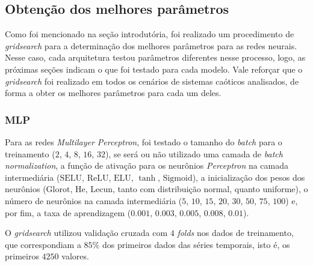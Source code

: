 \documentclass[10pt, technote]{article}
\newcommand{\sigmoid}{\text{Sigmoid}}
\newcommand{\selu}{\text{SELU}}
\newcommand{\relu}{\text{ReLU}}
\newcommand{\elu}{\text{ELU}}
\newcommand{\lecun}{\text{Lecun}}
\newcommand{\he}{\text{He}}
\newcommand{\glorot}{\text{Glorot}}
\begin{document}
\subsection{Obtenção dos melhores parâmetros}


Como foi mencionado na seção introdutória, foi realizado um procedimento de \textit{gridsearch} para a determinação dos melhores parâmetros para as redes neurais. Nesse caso, cada arquitetura testou parâmetros diferentes nesse processo, logo, as próximas seções indicam o que foi testado para cada modelo. Vale reforçar que o \textit{gridsearch} foi realizado em todos os cenários de sistemas caóticos analisados, de forma a obter os melhores parâmetros para cada um deles.

\subsubsection{MLP}

Para as redes \textit{Multilayer Perceptron}, foi testado o tamanho do \textit{batch} para o treinamento ($2$, $4$, $8$, $16$, $32$), se será ou não utilizado uma camada de \textit{batch normalization}, a função de ativação para os neurônios \textit{Perceptron} na camada intermediária ($\selu$, $\relu$, $\elu$, $\tanh$, $\sigmoid$), a inicialização dos pesos dos neurônios ($\glorot$, $\he$, $\lecun$, tanto com distribuição normal, quanto uniforme), o número de neurônios na camada intermediária ($5$, $10$, $15$, $20$, $30$, $50$, $75$, $100$) e, por fim, a taxa de aprendizagem ($0.001$, $0.003$, $0.005$, $0.008$, $0.01$). 

O \textit{gridsearch} utilizou validação cruzada com $4$ \textit{folds} nos dados de treinamento, que correspondiam a $85\%$ dos primeiros dados das séries temporais, isto é, os primeiros $4250$ valores.
\end{document}
